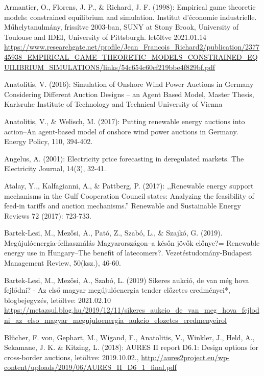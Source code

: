\documentclass[twoside, magyar, showtrims]{corvinusphd}
\theoremstyle{plain}
\theoremstyle{remark}
\theoremstyle{definition}
\begin{document}
\begin{thebibliography}{99}

Armantier, O., Florens, J. P., \& Richard, J. F. (1998): Empirical game theoretic models: constrained equilibrium and simulation. Institut d'économie industrielle. Műhelytanulmány, frissítve 2003-ban, SUNY at Stony Brook, University of Toulouse and IDEI, University of Pittsburgh. letöltve 2021.01.14
\url{https://www.researchgate.net/profile/Jean\_Francois\_Richard2/publication/237745938\_EMPIRICAL\_GAME\_THEORETIC\_MODELS\_CONSTRAINED\_EQUILIBRIUM\_SIMULATIONS/links/54c654c60cf219bbe4f829bf.pdf}

Anatolitis, V. (2016): Simulation of Onshore Wind Power Auctions in Germany Considering Different Auction Designs – an Agent Based Model, Master Thesis, Karlsruhe Institute of Technology and  Technical University of Vienna

Anatolitis, V., \& Welisch, M. (2017): Putting renewable energy auctions into action–An agent-based model of onshore wind power auctions in Germany. Energy Policy, 110, 394-402.

Angelus, A. (2001): Electricity price forecasting in deregulated markets. The Electricity Journal, 14(3), 32-41.

Atalay, Y.,, Kalfagianni, A., \& Pattberg, P. (2017): ,,Renewable energy support mechanisms in the Gulf Cooperation Council states: Analyzing the feasibility of feed-in tariffs and auction mechanisms.'' Renewable and Sustainable Energy Reviews 72 (2017): 723-733.

Bartek-Lesi, M., Mezősi, A., Pató, Z., Szabó, L., \& Szajkó, G. (2019). Megújulóenergia-felhasználás Magyarországon–a későn jövők előnye?= Renewable energy use in Hungary–The benefit of latecomers?. Vezetéstudomány-Budapest Management Review, 50(ksz.), 46-60.

Bartek-Lesi, M., Mezősi, A., Szabó, L. (2019) Sikeres aukció, de van még hova fejlődni? - Az első magyar megújulóenergia tender előzetes eredményei*, blogbejegyzés, letöltve: 2021.02.10
\url{https://metazsul.blog.hu/2019/12/11/sikeres\_aukcio\_de\_van\_meg\_hova\_fejlodni\_az\_elso\_magyar\_megujuloenergia\_aukcio\_elozetes\_eredmenyeirol}

Blücher, F. von, Gephart, M., Wigand, F., Anatolitis, V., Winkler, J., Held, A., Sekamane, J. K. \& Kitzing, L. (2018): AURES II report D6.1: Design options for cross-border auctions, letöltve: 2019.10.02., 
\url{http://aures2project.eu/wp-content/uploads/2019/06/AURES_II_D6_1_final.pdf}


\end{thebibliography}
\end{document}
